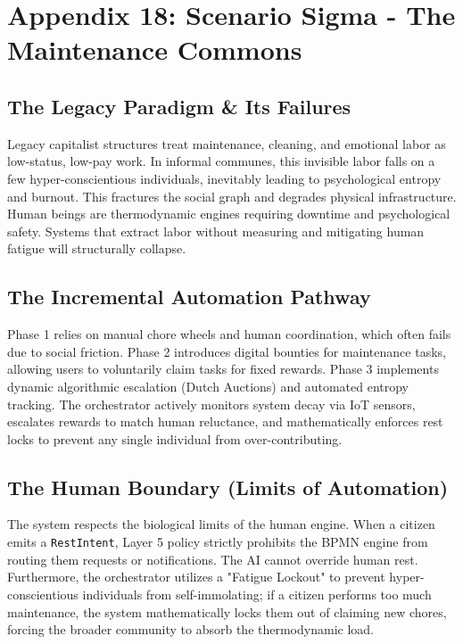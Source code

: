 \chapter{Appendix 18: Scenario Sigma - The Maintenance Commons}

\section{The Legacy Paradigm \& Its Failures}
Legacy capitalist structures treat maintenance, cleaning, and emotional labor as low-status, low-pay work. In informal communes, this invisible labor falls on a few hyper-conscientious individuals, inevitably leading to psychological entropy and burnout. This fractures the social graph and degrades physical infrastructure. Human beings are thermodynamic engines requiring downtime and psychological safety. Systems that extract labor without measuring and mitigating human fatigue will structurally collapse.

\section{The Incremental Automation Pathway}
Phase 1 relies on manual chore wheels and human coordination, which often fails due to social friction. Phase 2 introduces digital bounties for maintenance tasks, allowing users to voluntarily claim tasks for fixed rewards. Phase 3 implements dynamic algorithmic escalation (Dutch Auctions) and automated entropy tracking. The orchestrator actively monitors system decay via IoT sensors, escalates rewards to match human reluctance, and mathematically enforces rest locks to prevent any single individual from over-contributing.

\section{The Human Boundary (Limits of Automation)}
The system respects the biological limits of the human engine. When a citizen emits a \texttt{RestIntent}, Layer 5 policy strictly prohibits the BPMN engine from routing them requests or notifications. The AI cannot override human rest. Furthermore, the orchestrator utilizes a "Fatigue Lockout" to prevent hyper-conscientious individuals from self-immolating; if a citizen performs too much maintenance, the system mathematically locks them out of claiming new chores, forcing the broader community to absorb the thermodynamic load.

